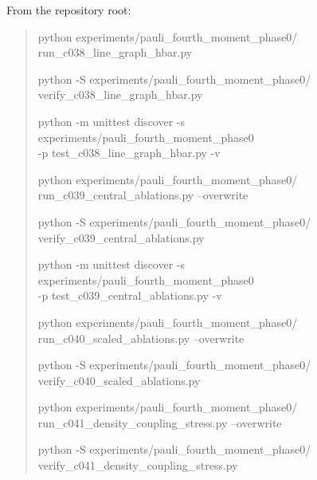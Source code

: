 \documentclass[11pt,a4paper]{article}
\theoremstyle{remark}
\begin{document}
From the repository root:
\begin{quote}\small\ttfamily\raggedright
python experiments/pauli\_fourth\_moment\_phase0/\\
\hspace*{1em}run\_c038\_line\_graph\_hbar.py\par
python -S experiments/pauli\_fourth\_moment\_phase0/\\
\hspace*{1em}verify\_c038\_line\_graph\_hbar.py\par
python -m unittest discover -s\\
\hspace*{1em}experiments/pauli\_fourth\_moment\_phase0\\
\hspace*{1em}-p test\_c038\_line\_graph\_hbar.py -v
\medskip\par
python experiments/pauli\_fourth\_moment\_phase0/\\
\hspace*{1em}run\_c039\_central\_ablations.py --overwrite\par
python -S experiments/pauli\_fourth\_moment\_phase0/\\
\hspace*{1em}verify\_c039\_central\_ablations.py\par
python -m unittest discover -s\\
\hspace*{1em}experiments/pauli\_fourth\_moment\_phase0\\
\hspace*{1em}-p test\_c039\_central\_ablations.py -v
\medskip\par
python experiments/pauli\_fourth\_moment\_phase0/\\
\hspace*{1em}run\_c040\_scaled\_ablations.py --overwrite\par
python -S experiments/pauli\_fourth\_moment\_phase0/\\
\hspace*{1em}verify\_c040\_scaled\_ablations.py\par
python experiments/pauli\_fourth\_moment\_phase0/\\
\hspace*{1em}run\_c041\_density\_coupling\_stress.py --overwrite\par
python -S experiments/pauli\_fourth\_moment\_phase0/\\
\hspace*{1em}verify\_c041\_density\_coupling\_stress.py

\end{quote}
\end{document}
